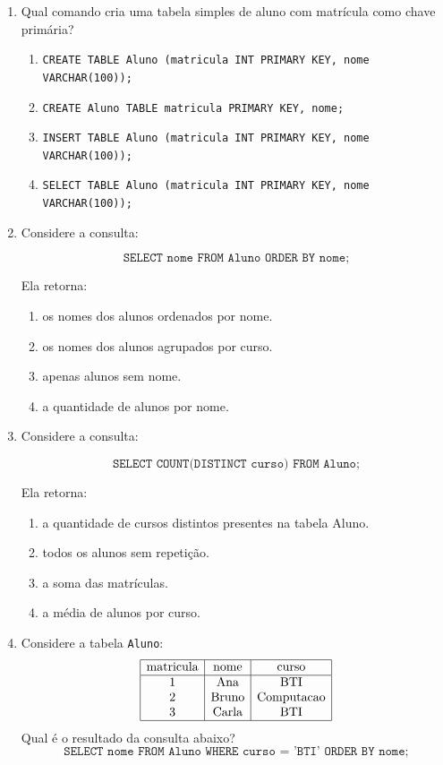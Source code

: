 \documentclass[12pt,a4paper]{article}
\begin{document}
\begin{enumerate}[resume,label=\textbf{Q\arabic*.}]
\item Qual comando cria uma tabela simples de aluno com matrícula como chave primária?

\begin{enumerate}[label=\alph*)]
    \item \texttt{CREATE TABLE Aluno (matricula INT PRIMARY KEY, nome VARCHAR(100));}
    \item \texttt{CREATE Aluno TABLE matricula PRIMARY KEY, nome;}
    \item \texttt{INSERT TABLE Aluno (matricula INT PRIMARY KEY, nome VARCHAR(100));}
    \item \texttt{SELECT TABLE Aluno (matricula INT PRIMARY KEY, nome VARCHAR(100));}
\end{enumerate}

\item Considere a consulta:

\[
\texttt{SELECT nome FROM Aluno ORDER BY nome;}
\]

Ela retorna:

\begin{enumerate}[label=\alph*)]
    \item os nomes dos alunos ordenados por nome.
    \item os nomes dos alunos agrupados por curso.
    \item apenas alunos sem nome.
    \item a quantidade de alunos por nome.
\end{enumerate}

\item Considere a consulta:

\[
\texttt{SELECT COUNT(DISTINCT curso) FROM Aluno;}
\]

Ela retorna:

\begin{enumerate}[label=\alph*)]
    \item a quantidade de cursos distintos presentes na tabela Aluno.
    \item todos os alunos sem repetição.
    \item a soma das matrículas.
    \item a média de alunos por curso.
\end{enumerate}

\item Considere a tabela \texttt{Aluno}:
\[
\begin{array}{|c|c|c|}
\hline
\text{matricula} & \text{nome} & \text{curso}\\
\hline
1 & \text{Ana} & \text{BTI}\\
2 & \text{Bruno} & \text{Computacao}\\
3 & \text{Carla} & \text{BTI}\\
\hline
\end{array}
\]
Qual é o resultado da consulta abaixo?
\[
\texttt{SELECT nome FROM Aluno WHERE curso = 'BTI' ORDER BY nome;}
\]


\end{enumerate}
\end{document}
